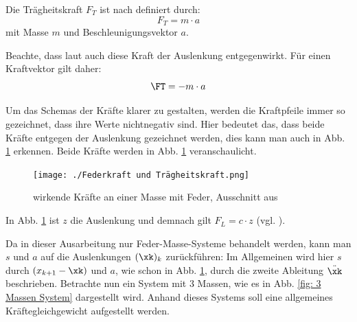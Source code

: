 \documentclass[a4paper,12pt]{report}
\newcommand{\1}{\mathds{1}}
\theoremstyle{plain} %
\theoremstyle{definition} %
\theoremstyle{remark}
\begin{document}
            Die Trägheitskraft $F_T$ ist nach \cite{trägheitskraft} definiert durch:
            \begin{equation}
                  \label{eqn: Trägheitskraft}
                  F_T = m\cdot a
            \end{equation}
            mit Masse $m$ und Beschleunigungsvektor $a$.    
            
            Beachte, dass laut \cite{trägheitskraft} auch diese Kraft der Auslenkung entgegenwirkt.
            Für einen Kraftvektor \FT gilt daher:
            $$\FT = -m\cdot a$$

            Um das Schemas der Kräfte klarer zu gestalten, werden die Kraftpfeile immer so gezeichnet, dass ihre Werte nichtnegativ sind.
            Hier bedeutet das, dass beide Kräfte entgegen der Auslenkung gezeichnet werden, dies kann man auch in Abb. \ref{fig: KräfteAnFeder} erkennen.
            Beide Kräfte werden in Abb. \ref{fig: KräfteAnFeder} veranschaulicht.

            \begin{figure}[h!t]
                  \centering
                  \texttt{[image: ./Federkraft und Trägheitskraft.png]}
                  \caption{wirkende Kräfte an einer Masse mit Feder, Ausschnitt aus \cite{BildKräfteFeder}}
                  \label{fig: KräfteAnFeder}
            \end{figure}
            In Abb. \ref{fig: KräfteAnFeder} ist $z$ die Auslenkung und demnach gilt $F_L = c\cdot z$ (vgl. \cite{federkraft}).

            Da in dieser Ausarbeitung nur Feder-Masse-Systeme behandelt werden, kann man $s$ und $a$ auf die Auslenkungen $(\xk)_k$ zurückführen:
            Im Allgemeinen wird hier $s$ durch $(x_{k+1}-\xk)$ und $a$, wie schon in Abb. \ref{fig: KräfteAnFeder}, durch die zweite Ableitung $\ddot \xk$ beschrieben.
            Betrachte nun ein System mit 3 Massen, wie es in Abb. \ref{fig: 3 Massen System} dargestellt wird.
            Anhand dieses Systems soll eine allgemeines Kräftegleichgewicht aufgestellt werden.
\end{document}
